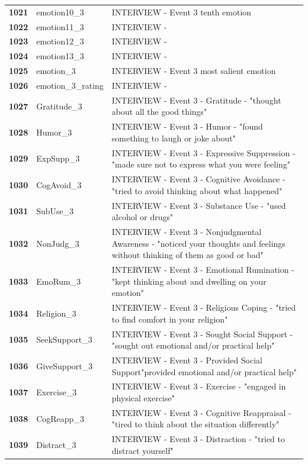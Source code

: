 \documentclass[
  letterpaper,
  DIV=11,
  numbers=noendperiod]{scrartcl}
\begin{document}
\begin{longtable}[t]{>{}cll}
\addlinespace
\textbf{1021} & emotion10\_3 & INTERVIEW - Event 3 tenth emotion\\
\textbf{1022} & emotion11\_3 & INTERVIEW -\\
\textbf{1023} & emotion12\_3 & INTERVIEW -\\
\textbf{1024} & emotion13\_3 & INTERVIEW -\\
\textbf{1025} & emotion\_3 & INTERVIEW - Event 3 most salient emotion\\
\addlinespace
\textbf{1026} & emotion\_3\_rating & INTERVIEW -\\
\textbf{1027} & Gratitude\_3 & INTERVIEW - Event 3 - Gratitude - "thought about all the good things"\\
\textbf{1028} & Humor\_3 & INTERVIEW - Event 3 - Humor - "found something to laugh or joke about"\\
\textbf{1029} & ExpSupp\_3 & INTERVIEW - Event 3 - Expressive Suppression - "made sure not to express what you were feeling"\\
\textbf{1030} & CogAvoid\_3 & INTERVIEW - Event 3 - Cognitive Avoidance - "tried to avoid thinking about what happened"\\
\addlinespace
\textbf{1031} & SubUse\_3 & INTERVIEW - Event 3 - Substance Use - "used alcohol or drugs"\\
\textbf{1032} & NonJudg\_3 & INTERVIEW - Event 3 - Nonjudgmental Awareness - "noticed your thoughts and feelings without thinking of them as good or bad"\\
\textbf{1033} & EmoRum\_3 & INTERVIEW - Event 3 - Emotional Rumination - "kept thinking about and dwelling on your emotion"\\
\textbf{1034} & Religion\_3 & INTERVIEW - Event 3 - Religious Coping - "tried to find comfort in your religion"\\
\textbf{1035} & SeekSupport\_3 & INTERVIEW - Event 3 - Sought Social Support - "sought out emotional and/or practical help"\\
\addlinespace
\textbf{1036} & GiveSupport\_3 & INTERVIEW - Event 3 - Provided Social Support"provided emotional and/or practical help"\\
\textbf{1037} & Exercise\_3 & INTERVIEW - Event 3 - Exercise - "engaged in physical exercise"\\
\textbf{1038} & CogReapp\_3 & INTERVIEW - Event 3 - Cognitive Reappraisal - "tired to think about the situation differently"\\
\textbf{1039} & Distract\_3 & INTERVIEW - Event 3 - Distraction - "tried to distract yourself"\\

\end{longtable}
\end{document}
